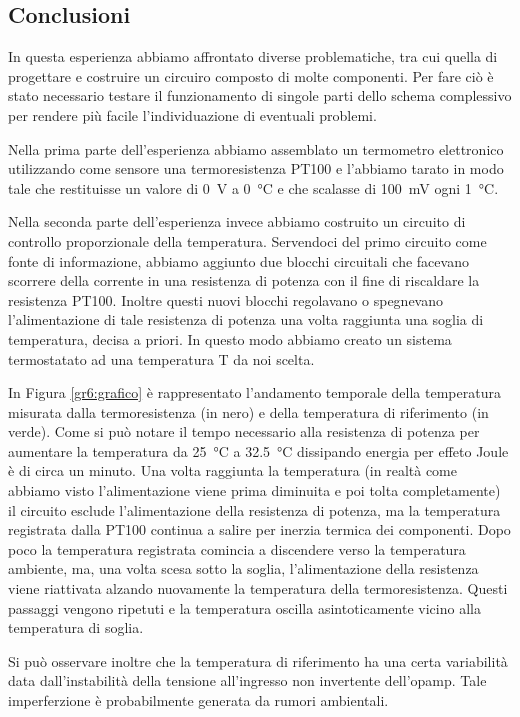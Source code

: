 \subsection*{Conclusioni}
In questa esperienza abbiamo affrontato diverse problematiche, tra cui quella di progettare e costruire un circuiro composto di molte componenti.
Per fare ciò è stato necessario testare il funzionamento di singole parti dello schema complessivo per rendere più facile l'individuazione di eventuali problemi.

Nella prima parte dell'esperienza abbiamo assemblato un termometro elettronico utilizzando come sensore una termoresistenza PT100 e l'abbiamo tarato in modo tale che restituisse un valore di \SI{0}{\V} a \SI{0}{\celsius} e che scalasse di \SI{100}{\mV} ogni \SI{1}{\celsius}.

Nella seconda parte dell'esperienza invece abbiamo costruito un circuito di controllo proporzionale della temperatura.
Servendoci del primo circuito come fonte di informazione, abbiamo aggiunto due blocchi circuitali che facevano scorrere della corrente in una resistenza di potenza con il fine di riscaldare la resistenza PT100.
Inoltre questi nuovi blocchi regolavano o spegnevano l'alimentazione di tale resistenza di potenza una volta raggiunta una soglia di temperatura, decisa a priori.
In questo modo abbiamo creato un sistema termostatato ad una temperatura T da noi scelta.

In Figura \ref{gr6:grafico} è rappresentato l'andamento temporale della temperatura misurata dalla termoresistenza (in nero) e della temperatura di riferimento (in verde).
Come si può notare il tempo necessario alla resistenza di potenza per aumentare la temperatura da \SI{25}{\celsius} a \SI{32.5}{\celsius} dissipando energia per effeto Joule è di circa un minuto.
Una volta raggiunta la temperatura (in realtà come abbiamo visto l'alimentazione viene prima diminuita e poi tolta completamente) il circuito esclude l'alimentazione della resistenza di potenza, ma la temperatura registrata dalla PT100 continua a salire per inerzia termica dei componenti.
Dopo poco la temperatura registrata comincia a discendere verso la temperatura ambiente, ma, una volta scesa sotto la soglia, l'alimentazione della resistenza viene riattivata alzando nuovamente la temperatura della termoresistenza.
Questi passaggi vengono ripetuti e la temperatura oscilla asintoticamente vicino alla temperatura di soglia.

Si può osservare inoltre che la temperatura di riferimento ha una certa variabilità data dall'instabilità della tensione all'ingresso non invertente dell'opamp. Tale imperferzione è probabilmente generata da rumori ambientali.
